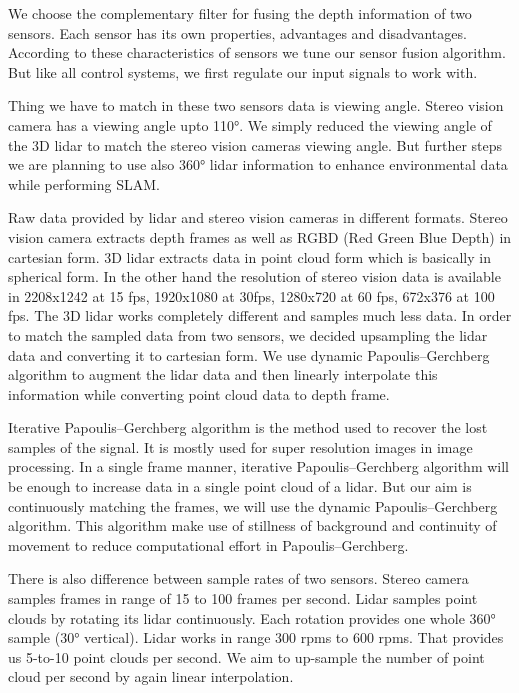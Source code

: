 \documentclass[12pt]{article}
\begin{document}
We choose the complementary filter for fusing the depth information of two sensors. Each sensor has its own properties, advantages and disadvantages. According to these characteristics of sensors we tune our sensor fusion algorithm. But like all control systems, we first regulate our input signals to work with.

Thing we have to match in these two sensors data is viewing angle. Stereo vision camera has a viewing angle upto 110°. We simply reduced the viewing angle of the 3D lidar to match the stereo vision cameras viewing angle. But further steps we are planning to use also 360° lidar information to enhance environmental data while performing SLAM.

Raw data provided by lidar and stereo vision cameras in different formats. Stereo vision camera extracts depth frames as well as RGBD (Red Green Blue Depth) in cartesian form. 3D lidar extracts data in point cloud form which is basically in spherical form. In the other hand the resolution of stereo vision data is available in 2208x1242 at 15 fps, 1920x1080 at 30fps, 1280x720 at 60 fps, 672x376 at 100 fps. The 3D lidar works completely different and samples much less data. In order to match the sampled data from two sensors, we decided upsampling the lidar data and converting it to cartesian form. We use dynamic Papoulis–Gerchberg algorithm to augment the lidar data and then linearly interpolate this information while converting point cloud data to depth frame.

Iterative Papoulis–Gerchberg algorithm is the method used to recover the lost samples of the signal. It is mostly used for super resolution images in image processing. In a single frame manner, iterative Papoulis–Gerchberg algorithm will be enough to increase data in a single point cloud of a lidar. But our aim is continuously matching the frames, we will use the dynamic Papoulis–Gerchberg algorithm. This algorithm make use of stillness of background and continuity of movement to reduce computational effort in Papoulis–Gerchberg.

There is also difference between sample rates of two sensors. Stereo camera samples frames in range of 15 to 100 frames per second. Lidar samples point clouds by rotating its lidar continuously. Each rotation provides one whole 360° sample (30° vertical). Lidar works in range 300 rpms to 600 rpms. That provides us 5-to-10 point clouds per second. We aim to up-sample the  number of point cloud per second by again linear interpolation.
\end{document}
